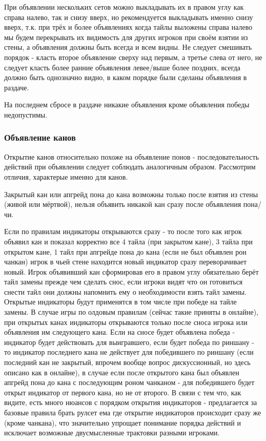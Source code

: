 При объявлении нескольких сетов можно выкладывать их в правом углу как справа налево, так и снизу вверх, но рекомендуется выкладывать именно снизу вверх, т.к. при трёх и более объявлениях когда тайлы выложены справа налево мы будем перекрывать их видимость для других игроков при своём взятии из стены, а объявления должны быть всегда и всем видны. Не следует смешивать порядок - класть второе объявление сверху над первым, а третье слева от него, не следует класть более ранние объявления левее/выше более поздних, всегда должно быть однозначно видно, в каком порядке были сделаны объявления в раздаче.

На последнем сбросе в раздаче никакие объявления кроме объявления победы недопустимы.

\subsubsection{Объявление канов}

Открытие канов относительно похоже на объявление понов - последовательность действий при объявлении следует соблюдать аналогичным образом. Рассмотрим отличия, характерые именно для канов.

Закрытый кан или апгрейд пона до кана возможны только после взятия из стены (живой или мёртвой), нельзя объявить никакой кан сразу после объявления пона/чи.


 Если по правилам индикаторы открываются сразу - то после того как игрок объявил кан и показал корректно все 4 тайла (при закрытом кане), 3 тайла при открытом кане, 1 тайл при апгрейде пона до кана (если не был объявлен рон чанкан) игрок в чьей стене находится новый индикатор сразу переворачивает новый. Игрок объявивший кан сформировав его в правом углу обязательно берёт тайл замены прежде чем сделать снос, если игроки видят что он готовиться снести тайл они должны напомнить ему о необходимости взять тайл замены. Открытые индикаторы будут применятся в том числе при победе на тайле замены. В случае игры по олдовым правилам (сейчас такие приняты в онлайне), при открытых канах индикаторы открываются только после сноса игрока или объявления им следующего кана. Если на сносе будет объявлена победа - индикатор будет действовать для выигравшего, если будет победа по риншану - то индикатор последнего кана не действует для победившего по риншану (если последний кан не закрытый, впрочем вообще вопрос дискуссионный, но здесь описано как в онлайне), в случае если после открытого кана был объявлен апгрейд пона до кана с последующим роном чанканом - для победившего будет открыт индикатор от первого кана, но не от второго. В связи с тем что, как видите, есть много нюансов с порядком открытия индикаторов - предлагается за базовые правила брать рулсет ема где открытие индикаторов происходит сразу же (кроме чанкана), что значительно упрощает понимание порядка действий и исключает возможные двусмысленные трактовки разными игроками.

